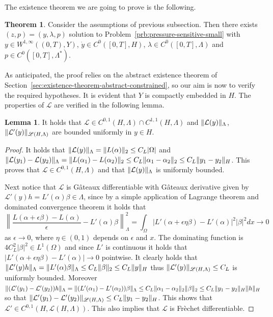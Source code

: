 \documentclass[a4paper,10pt,twoside]{amsbook}
\numberwithin{section}{chapter}
\numberwithin{equation}{chapter}
\theoremstyle{definition}
\newtheorem{thm}[prop]{Theorem}
\newtheorem{lemma}[prop]{Lemma}
\DeclarePairedDelimiter{\norm}{\lVert}{\rVert}
\begin{document}
The existence theorem we are going to prove is the following.
\begin{thm}
\label{thm:existence-pressure-small}
Consider the assumptions of previous subsection. Then there exists $(z,p)=(y,\lambda,p)$ solution to Problem~\ref{prb:pressure-sensitive-small} with $y\in W^{1,\infty}((0,T),Y)$, $\dot y\in C^0([0,T],H)$, $\lambda\in C^0([0,T],\Lambda)$ and $p\in C^0([0,T],\Lambda^*)$.
\end{thm}
As anticipated, the proof relies on the abstract existence theorem of Section~\ref{sec:existence-theorem-abstract-constrained}, so our aim is now to verify the required hypotheses. It is evident that $Y$ is compactly embedded in $H$. The properties of $\mathcal{L}$ are verified in the following lemma.
\begin{lemma}
It holds that $\mathcal{L}\in C^{0,1}(H,\Lambda)\cap C^{1,1}(H,\Lambda)$ and $\norm{\mathcal{L}(y)}_\Lambda$, $\norm{\mathcal{L}'(y)}_{\mathscr{L}(H,\Lambda)}$ are bounded uniformly in $y\in H$.
\end{lemma}
\begin{proof}
It holds that $\norm{\mathcal{L}(y)}_\Lambda=\norm{L(\alpha)}_2\le C_L|\Omega|$ and $\norm{\mathcal{L}(y_1)-\mathcal{L}(y_2)}_\Lambda=\norm{L(\alpha_1)-L(\alpha_2)}_2\le C_L\norm{\alpha_1-\alpha_2}_2\le C_L\norm{y_1-y_2}_H$. This proves that $\mathcal{L}\in C^{0,1}(H,\Lambda)$ and that $\norm{\mathcal{L}(y)}_\Lambda$ is uniformly bounded.

Next notice that $\mathcal{L}$ is G\^ateaux differentiable with G\^ateaux derivative given by $\mathcal{L}'(y)h=L'(\alpha)\beta\in\Lambda$, since by a simple application of Lagrange theorem and dominated convergence theorem it holds that
\[
\left\|\frac{{L}(\alpha+\epsilon\beta)-{L}(\alpha)}{\epsilon}-L'(\alpha)\beta\right\|_\Lambda^2=\int_\Omega|L'(\alpha+\epsilon\eta\beta)-L'(\alpha)|^2|\beta|^2dx\to0
\]
as $\epsilon\to0$, where $\eta\in(0,1)$ depends on $\epsilon$ and $x$. The dominating function is $4C_L^2|\beta|^2\in L^1(\Omega)$ and since $L'$ is continuous it holds that $|L'(\alpha+\epsilon\eta\beta)-L'(\alpha)|\to0$ pointwise. It clearly holds that $\norm{\mathcal{L}'(y)h}_\Lambda=\norm{L'(\alpha)\beta}_\Lambda\le C_L\norm{\beta}_2\le C_L\norm{y}_H$ thus $\norm{\mathcal{L}'(y)}_{\mathscr{L}(H,\Lambda)}\le C_L$ is uniformly bounded. Moreover $\norm{(\mathcal{L}'(y_1)-\mathcal{L}'(y_2))h}_\Lambda=\norm{({L}'(\alpha_1)-{L}'(\alpha_2))\beta}_\Lambda\le C_L\norm{\alpha_1-\alpha_2}_2\norm{\beta}_2\le C_L\norm{y_1-y_2}_H\norm{h}_H$ so that $\norm{\mathcal{L}'(y_1)-\mathcal{L}'(y_2)}_{\mathscr{L}(H,\Lambda)}\le C_L\norm{y_1-y_2}_H$. This shows that $\mathcal{L}'\in C^{0,1}(H,\mathscr{L}(H,\Lambda))$. This also implies that $\mathcal{L}$ is Frèchet differentiable.
\end{proof}
\end{document}
